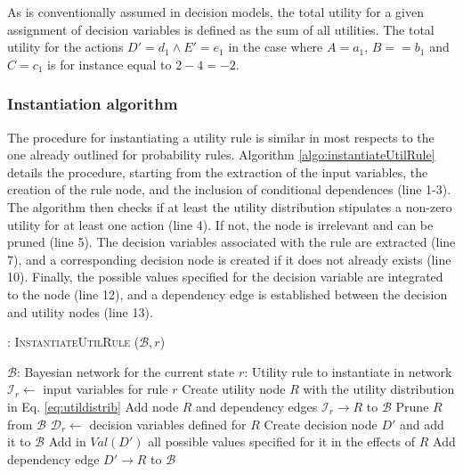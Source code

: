 As is conventionally assumed in decision models, the total utility for a given assignment of decision variables is defined as the sum of all utilities.  The total utility for the actions $D'\!=\!d_1 \land E'\!=\!e_1$ in the case where $A\!=\!a_1$, $B=\!=\!b_1$ and $C\!=\!c_1$ is for instance equal to $2 - 4 = -2$. 


\subsubsection*{Instantiation algorithm} 

The procedure for instantiating a utility rule is similar in most respects to the one already outlined for probability rules. Algorithm \ref{algo:instantiateUtilRule} details the procedure, starting from the extraction of the input variables, the creation of the rule node, and the inclusion of conditional dependences (line 1-3). The algorithm then checks if at least the utility distribution stipulates a non-zero utility for at least one action (line 4).  If not, the node is irrelevant and can be pruned (line 5).  The decision variables associated with the rule are extracted (line 7), and a corresponding decision node is created if it does not already exists (line 10). Finally, the possible values specified for the decision variable are integrated to the node (line 12), and a dependency edge is established between the decision and utility nodes (line 13). 

\begin{algorithm}[h!]
\caption{: \textsc{InstantiateUtilRule} ($\mathcal{B}, r$)}
\begin{algorithmic}[1] \vspace{1mm}
\REQUIRE $\mathcal{B}$: Bayesian network for the current state
\REQUIRE $r$: Utility rule to instantiate in network  \vspace{1mm}
\STATE $\mathcal{I}_{r} \leftarrow $ input variables for rule $r$
\STATE Create utility node $R$ with the utility distribution in Eq. \eqref{eq:utildistrib}
\STATE Add node $R$ and dependency edges $\mathcal{I}_{r} \rightarrow R$ to $\mathcal{B}$ 
\STATE Prune $R$ from $\mathcal{B}$
\ELSE
\STATE $\mathcal{D}_{r} \leftarrow$ decision variables defined for $R$
\STATE Create decision node $D'$ and add it to $\mathcal{B}$
\ENDIF
\STATE Add in $Val(D')$ all possible values specified for it in the effects of $R$
\STATE Add dependency edge $D' \rightarrow R$ to $\mathcal{B}$ 
\ENDFOR
\ENDIF
\end{algorithmic}
\label{algo:instantiateUtilRule}
\end{algorithm}

